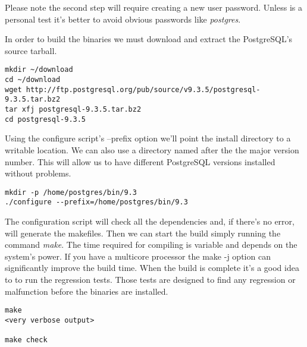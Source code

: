 %
%

Please note the second step will require creating a new user password. Unless is a personal
test it's better to avoid obvious passwords like \textit{postgres}.\newline

In order to build the binaries we must download and extract the PostgreSQL's source tarball.

\begin{verbatim}
mkdir ~/download
cd ~/download
wget http://ftp.postgresql.org/pub/source/v9.3.5/postgresql-9.3.5.tar.bz2
tar xfj postgresql-9.3.5.tar.bz2
cd postgresql-9.3.5
\end{verbatim}


Using the configure script's --prefix option we'll point the install directory to a writable
location. We can also use a directory named after the the major version number. This will allow
us to have different PostgreSQL versions installed without problems.

\begin{verbatim}
mkdir -p /home/postgres/bin/9.3
./configure --prefix=/home/postgres/bin/9.3
\end{verbatim}

The configuration script will check all the dependencies and, if there's no error, will generate 
the makefiles. Then we can start the build simply running the command \textit{make}. The time
required for compiling is variable and depends on the system's power. If you have a multicore
processor the make -j option can significantly improve the build time. When the build is complete
it's a good idea to to run the regression tests. Those tests are designed to find any regression or
malfunction before the binaries are installed.

\begin{verbatim}
make
<very verbose output>

make check 

\end{verbatim}

